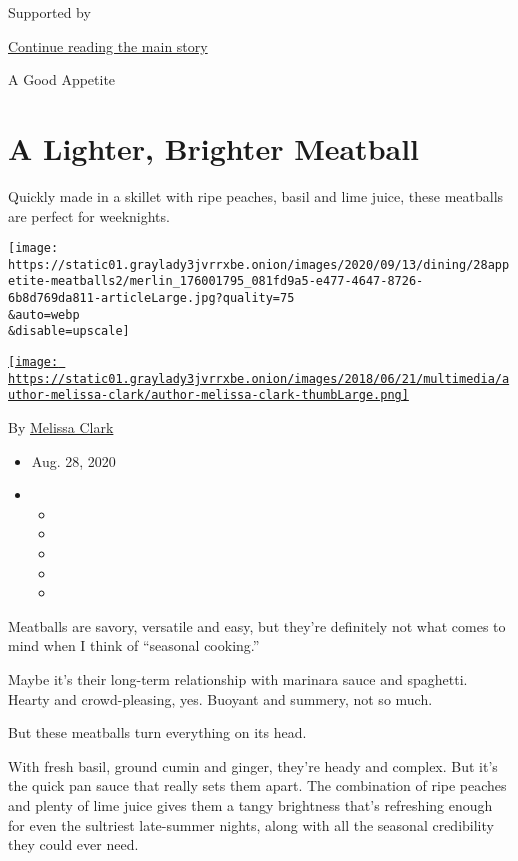 Supported by

\protect\hyperlink{after-sponsor}{Continue reading the main story}

A Good Appetite

\hypertarget{a-lighter-brighter-meatball}{%
\section{A Lighter, Brighter
Meatball}\label{a-lighter-brighter-meatball}}

Quickly made in a skillet with ripe peaches, basil and lime juice, these
meatballs are perfect for weeknights.

\texttt{[image: https://static01.graylady3jvrrxbe.onion/images/2020/09/13/dining/28appetite-meatballs2/merlin\_176001795\_081fd9a5-e477-4647-8726-6b8d769da811-articleLarge.jpg?quality=75\\\&auto=webp\\\&disable=upscale]}

\href{https://www.nytimes3xbfgragh.onion/by/melissa-clark}{\texttt{[image: https://static01.graylady3jvrrxbe.onion/images/2018/06/21/multimedia/author-melissa-clark/author-melissa-clark-thumbLarge.png]}}

By \href{https://www.nytimes3xbfgragh.onion/by/melissa-clark}{Melissa
Clark}

\begin{itemize}
\item
  Aug. 28, 2020
\item
  \begin{itemize}
  \item
  \item
  \item
  \item
  \item
  \end{itemize}
\end{itemize}

Meatballs are savory, versatile and easy, but they're definitely not
what comes to mind when I think of ``seasonal cooking.''

Maybe it's their long-term relationship with marinara sauce and
spaghetti. Hearty and crowd-pleasing, yes. Buoyant and summery, not so
much.

But these meatballs turn everything on its head.

With fresh basil, ground cumin and ginger, they're heady and complex.
But it's the quick pan sauce that really sets them apart. The
combination of ripe peaches and plenty of lime juice gives them a tangy
brightness that's refreshing enough for even the sultriest late-summer
nights, along with all the seasonal credibility they could ever need.


